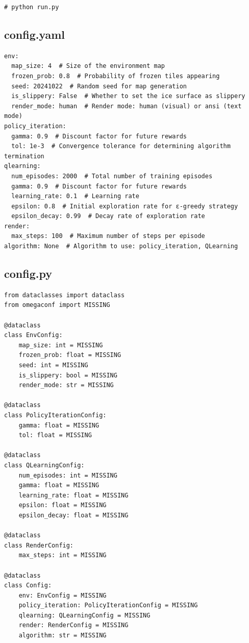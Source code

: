 \documentclass[a4paper,12pt]{article}
\begin{document}
\begin{appendices}
\begin{verbatim}
# python run.py
\end{verbatim}

\subsection*{config.yaml}
\begin{verbatim}
env:
  map_size: 4  # Size of the environment map
  frozen_prob: 0.8  # Probability of frozen tiles appearing
  seed: 20241022  # Random seed for map generation
  is_slippery: False  # Whether to set the ice surface as slippery
  render_mode: human  # Render mode: human (visual) or ansi (text mode)
policy_iteration:
  gamma: 0.9  # Discount factor for future rewards
  tol: 1e-3  # Convergence tolerance for determining algorithm termination
qlearning:
  num_episodes: 2000  # Total number of training episodes
  gamma: 0.9  # Discount factor for future rewards
  learning_rate: 0.1  # Learning rate
  epsilon: 0.8  # Initial exploration rate for ε-greedy strategy
  epsilon_decay: 0.99  # Decay rate of exploration rate
render:
  max_steps: 100  # Maximum number of steps per episode
algorithm: None  # Algorithm to use: policy_iteration, QLearning
\end{verbatim}

\subsection*{config.py}
\begin{verbatim}
from dataclasses import dataclass
from omegaconf import MISSING

@dataclass
class EnvConfig:
    map_size: int = MISSING
    frozen_prob: float = MISSING
    seed: int = MISSING
    is_slippery: bool = MISSING
    render_mode: str = MISSING

@dataclass
class PolicyIterationConfig:
    gamma: float = MISSING
    tol: float = MISSING

@dataclass
class QLearningConfig:
    num_episodes: int = MISSING
    gamma: float = MISSING
    learning_rate: float = MISSING
    epsilon: float = MISSING
    epsilon_decay: float = MISSING

@dataclass
class RenderConfig:
    max_steps: int = MISSING

@dataclass
class Config:
    env: EnvConfig = MISSING
    policy_iteration: PolicyIterationConfig = MISSING
    qlearning: QLearningConfig = MISSING
    render: RenderConfig = MISSING
    algorithm: str = MISSING
\end{verbatim}


\end{appendices}
\end{document}
